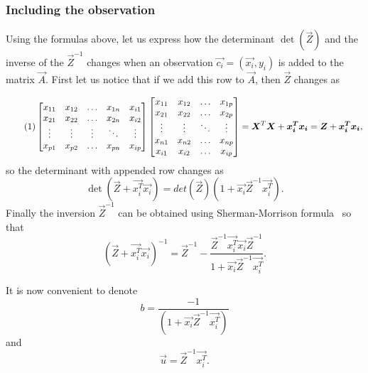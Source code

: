 
\subsubsection*{Including the observation} 

Using the formulas above, let us express how the determinant $\det(\vec{Z})$ and the inverse of the $\vec{Z}^{-1}$ changes when an observation $\vec{c_i} = (\vec{x_i}, y_i)$ is added to the matrix $\vec{A}$. First let us notice that if we add this row to $\vec{A}$, then  $\vec{Z}$ changes as

\[ \numberthis \label{addedrow}
\begin{bmatrix}
    x_{11} & x_{12} & \dots  & x_{1n} & x_{i1}  \\
    x_{21} & x_{22} & \dots  & x_{2n} & x_{i2} \\
    \vdots & \vdots & \vdots & \ddots & \vdots \\
    x_{p1} & x_{p2} & \dots  & x_{pn} & x_{ip}     
\end{bmatrix}
\begin{bmatrix}
    x_{11} & x_{12}  & \dots  & x_{1p} \\
    x_{21} & x_{22}  & \dots  & x_{2p} \\
    \vdots  & \vdots & \ddots & \vdots \\
    x_{n1} & x_{n2}  & \dots  & x_{np} \\
    x_{i1} & x_{i2}  & \dots  & x_{ip}
\end{bmatrix}
 = \vec{X}^T\vec{X} + \vec{x_i^T}\vec{x_i} = \vec{Z} + \vec{x_i^T}\vec{x_i},
\]
so the determinant with appended row changes as
\begin{equation} \label{udpateddeterminant}
    \det(\vec{Z} + \vec{x_i^T}\vec{x_i}) = det(\vec{Z})(1 + \vec{x_i}\vec{Z}^{-1}\vec{x_i^T}).
\end{equation}
Finally the inversion $\vec{Z}^{-1}$ can be obtained using Sherman-Morrison formula~\cite{bartlett1951inverse} so that 
\begin{equation} \label{shermanmorris}
    (\vec{Z} + \vec{x_i^T}\vec{x_i})^{-1} = \vec{Z}^{-1} - \dfrac{\vec{Z}^{-1}\vec{x_i^T}\vec{x_i}\vec{Z}^{-1}}{1 + \vec{x_i}\vec{Z}^{-1}\vec{x_i^T}}.
\end{equation}

It is now convenient to denote 
\begin{equation}
    b = \dfrac{-1}{(1 + \vec{x_i}\vec{Z}^{-1}\vec{x_i^T})}
\end{equation}
and 
\begin{equation} \label{agullo_u}
    \vec{u} = \vec{Z}^{-1}\vec{x_i^T}.
\end{equation}

